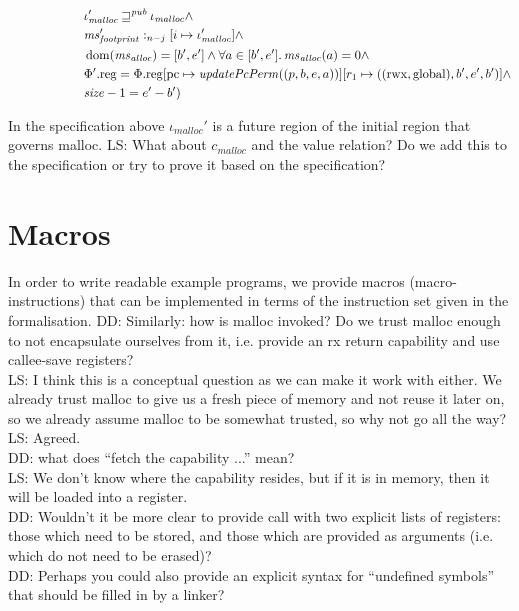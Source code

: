 \documentclass[a4paper]{article}
\newcommand{\update}[2]{[#1 \mapsto #2]}
\DeclareMathOperator{\dom}{dom}
\newcommand\lau[1]{{\color{purple} \sf \footnotesize {LS: #1}}\\}
\newcommand\dominique[1]{{\color{purple} \sf \footnotesize {DD: #1}}\\}
\newcommand{\var}[1]{\mathit{#1}}
\newcommand{\hs}{\var{ms}}
\newcommand{\ms}{\hs}
\newcommand{\pcreg}{\mathrm{pc}}
\newcommand{\heap}{\var{mem}}
\newcommand{\plainproj}[1]{\mathrm{#1}}
\newcommand{\memreg}[1][\Phi]{#1.\plainproj{reg}}
\newcommand{\plainfun}[2]{
  \ifthenelse{\equal{#2}{}}
  {\mathit{#1}}
  {\mathit{#1}(#2)}
}
\newcommand{\updatePcPerm}[1]{\plainfun{updatePcPerm}{#1}}
\newcommand{\futurewk}{\mathbin{\sqsupseteq}^{\var{pub}}}
\newcommand{\heapSat}[3][\heap]{#1 :_{#2} #3}
\newcommand{\codelabel}[1]{\mathit{#1}}
\newcommand{\malloc}{\codelabel{malloc}}
\newcommand{\plainperm}[1]{\mathrm{#1}}
\newcommand{\rwx}{\plainperm{rwx}}
\newcommand{\glob}{\plainperm{global}}
\begin{document}
\begin{specification}[Malloc v.2]
\[\begin{aligned}
                    &\qquad \qquad \qquad \iota_{\malloc}' \futurewk \iota_\malloc \land \\
                    &\qquad \qquad \qquad \heapSat[\ms_{\var{footprint}}']{n-j}{[i \mapsto \iota_\malloc']} \land \\
                    &\qquad \qquad \qquad \dom(\hs_{\var{alloc}}) = [b',e'] \land \forall a \in [b',e']\ldotp \hs_{\var{alloc}}(a) = 0  \land \\
                    &\qquad \qquad \qquad \memreg[\Phi'] = \memreg[\Phi]\update{\pcreg}{\updatePcPerm{(p,b,e,a)}}\update{r_1}{((\rwx,\glob),b',e',b')} \land \\
                    &\qquad \qquad \qquad \size - 1 = e'-b' )
                  \end{aligned}
                \]
              \end{specification}
              In the specification above $\iota_\malloc'$ is a future region of the initial region that governs malloc.
              \lau{What about $c_\malloc$ and the value relation? Do we add this to the specification or try to prove it based on the specification?}

              \section{Macros}
              In order to write readable example programs, we provide macros (macro-instructions) that can be implemented in terms of the instruction set given in the formalisation.
              \dominique{Similarly: how is malloc invoked?  Do we trust malloc enough to not encapsulate ourselves from it, i.e. provide an rx return capability and use callee-save registers?}
              \lau{ I think this is a conceptual question as we can make it work with either. We already trust malloc to give us a fresh piece of memory and not reuse it later on, so we already assume malloc to be somewhat trusted, so why not go all the way? }
              \lau{Agreed.}

              \dominique{what does ``fetch the capability ...'' mean?}
              \lau{ We don't know where the capability resides, but if it is in memory, then it will be loaded into a register. }
              \dominique{Wouldn't it be more clear to provide call with two explicit lists of registers: those which need to be stored, and those which are provided as arguments (i.e. which do not need to be erased)?}
              \dominique{Perhaps you could also provide an explicit syntax for ``undefined symbols'' that should be filled in by a linker?}
\end{document}
